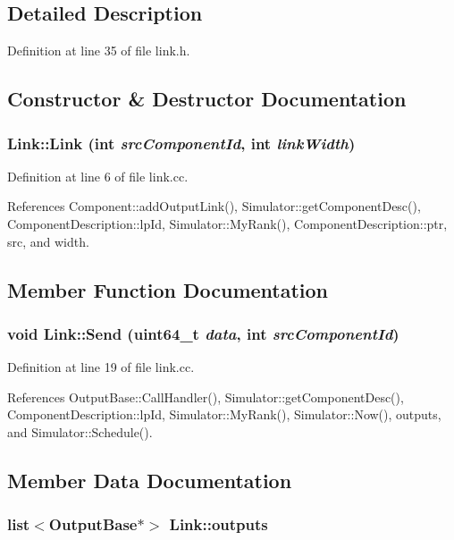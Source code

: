 \subsection{Detailed Description}


Definition at line 35 of file link.h.

\subsection{Constructor \& Destructor Documentation}
\subsubsection[{Link}]{\setlength{\rightskip}{0pt plus 5cm}Link::Link (int {\em srcComponentId}, \/  int {\em linkWidth})}\label{classLink_16c40a3222f347d6b3fc2698fc5b9038}




Definition at line 6 of file link.cc.

References Component::addOutputLink(), Simulator::getComponentDesc(), ComponentDescription::lpId, Simulator::MyRank(), ComponentDescription::ptr, src, and width.

\subsection{Member Function Documentation}
\subsubsection[{Send}]{\setlength{\rightskip}{0pt plus 5cm}void Link::Send (uint64\_\-t {\em data}, \/  int {\em srcComponentId})}\label{classLink_9739f28f141d67a3ab14ddd6e4edc985}




Definition at line 19 of file link.cc.

References OutputBase::CallHandler(), Simulator::getComponentDesc(), ComponentDescription::lpId, Simulator::MyRank(), Simulator::Now(), outputs, and Simulator::Schedule().

\subsection{Member Data Documentation}
\subsubsection[{outputs}]{\setlength{\rightskip}{0pt plus 5cm}list$<${\bf OutputBase}$\ast$$>$ {\bf Link::outputs}}\label{classLink_ffbc0480926b9f0e59c7581a5ccc1cee}




